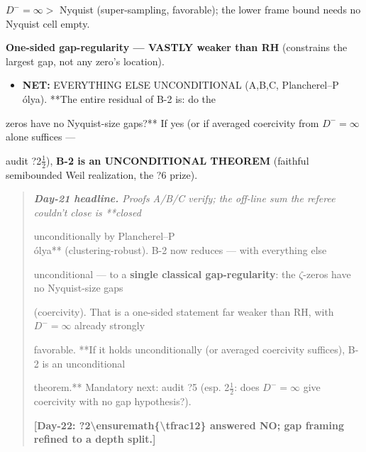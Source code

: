 \documentclass[10pt]{article}
\begin{document}
  $D^-=\infty>$ Nyquist (super-sampling, favorable); the lower frame bound needs no Nyquist cell empty.\par
  \textbf{One-sided gap-regularity --- VASTLY weaker than RH} (constrains the largest gap, not any zero's location).\par
\begin{itemize}
\item \textbf{NET:} EVERYTHING ELSE UNCONDITIONAL (A,B,C, Plancherel--P\\\'olya). **The entire residual of B-2 is: do the
\end{itemize}
  zeros have no Nyquist-size gaps?** If yes (or if averaged coercivity from $D^-=\infty$ alone suffices ---\par
  audit ?2\ensuremath{\tfrac12}), \textbf{B-2 is an UNCONDITIONAL THEOREM} (faithful semibounded Weil realization, the ?6 prize).\par

\begin{quote}\itshape
\textbf{Day-21 headline.} Proofs A/B/C verify; the off-line sum the referee couldn't close is **closed\par
unconditionally by Plancherel--P\\\'olya** (clustering-robust). B-2 now reduces --- with everything else\par
unconditional --- to a \textbf{single classical gap-regularity}: the $\zeta$-zeros have no Nyquist-size gaps\par
(coercivity). That is a one-sided statement far weaker than RH, with $D^-=\infty$ already strongly\par
favorable. **If it holds unconditionally (or averaged coercivity suffices), B-2 is an unconditional\par
theorem.** Mandatory next: audit ?5 (esp. 2\ensuremath{\tfrac12}: does $D^-=\infty$ give coercivity with no gap hypothesis?).\par
\textbf{[Day-22: ?2\textbackslash{}ensuremath\{\textbackslash{}tfrac12\} answered NO; gap framing refined to a depth split.]}\par
\end{quote}
\end{document}
